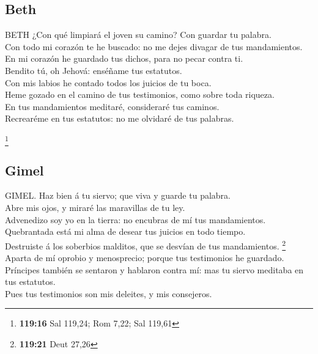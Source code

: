 \hypertarget{beth}{%
\subsection{Beth}\label{beth}}

 BETH ¿Con qué limpiará el joven su camino? Con guardar tu
palabra.\\
 Con todo mi corazón te he buscado: no me dejes divagar
de tus mandamientos.\\
 En mi corazón he guardado tus dichos, para no pecar
contra ti.\\
 Bendito tú, oh Jehová: enséñame tus estatutos.\\
 Con mis labios he contado todos los juicios de tu
boca.\\
 Heme gozado en el camino de tus testimonios, como sobre
toda riqueza.\\
 En tus mandamientos meditaré, consideraré tus caminos.\\
 Recrearéme en tus estatutos: no me olvidaré de tus
palabras.

\footnote{\textbf{119:16} Sal 119,24; Rom 7,22; Sal 119,61}

\hypertarget{gimel}{%
\subsection{Gimel}\label{gimel}}

 GIMEL. Haz bien á tu siervo; que viva y guarde tu
palabra.\\
 Abre mis ojos, y miraré las maravillas de tu ley.\\
 Advenedizo soy yo en la tierra: no encubras de mí tus
mandamientos.\\
 Quebrantada está mi alma de desear tus juicios en todo
tiempo.\\
 Destruiste á los soberbios malditos, que se desvían de
tus mandamientos. \footnote{\textbf{119:21} Deut 27,26}\\
 Aparta de mí oprobio y menosprecio; porque tus
testimonios he guardado.\\
 Príncipes también se sentaron y hablaron contra mí: mas
tu siervo meditaba en tus estatutos.\\
 Pues tus testimonios son mis deleites, y mis consejeros.

